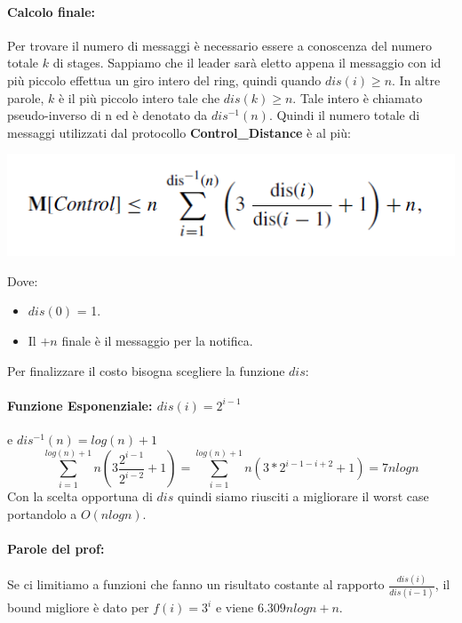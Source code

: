 \paragraph{Calcolo finale:}
Per trovare il numero di messaggi è necessario essere a conoscenza del numero
totale $k$ di stages. Sappiamo che il leader sarà eletto appena il messaggio con
id più piccolo effettua un giro intero del ring, quindi quando $dis(i) \geq n$.
In altre parole, $k$ è il più piccolo intero tale che $dis(k) \geq n$. Tale
intero è chiamato pseudo-inverso di n ed è denotato da $dis^{-1}(n)$. Quindi il
numero totale di messaggi utilizzati dal protocollo \textbf{Control\_Distance} è
al più:
\begin{center}
    \includegraphics[scale=0.6]{capitoli/leader-election/imgs/dd.png}
\end{center}
Dove:
\begin{itemize}
    \item $dis(0)$ = 1.
    \item Il $+ n$ finale è il messaggio per la notifica.
\end{itemize}

Per finalizzare il costo bisogna scegliere la funzione $dis$:\\

\paragraph{Funzione Esponenziale: $dis(i) = 2^{i-1}$} e $dis^{-1}(n) =log(n) + 1$
$$\sum_{i=1}^{log(n) + 1 }n(3\frac{2^{i-1}}{2^{i-2}} + 1) = \sum_{i=1}^{log(n) +
        1 }n(3 * 2^{i-1-i+2}+1) =  7nlogn$$ Con la scelta opportuna di $dis$ quindi
siamo riusciti a migliorare il worst case portandolo a $O(nlogn)$.\\

\paragraph{Parole del prof:} Se ci limitiamo a funzioni che fanno un risultato
costante al rapporto $\frac{dis(i)}{dis(i-1)}$, il bound migliore è dato per
$f(i) = 3^i$ e viene $6.309 n log n + n$.

